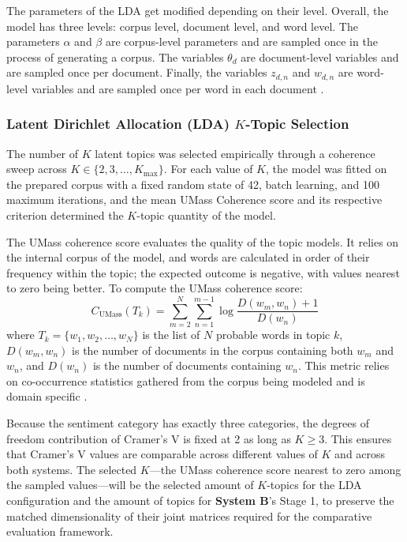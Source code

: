 \documentclass[12pt,a4paper]{report}
\newcommand{\sysB}{\textbf{System B}}
\begin{document}
The parameters of the LDA get modified depending on their level. Overall, the
model has three levels: corpus level, document level, and word level. The
parameters $\alpha$ and $\beta$ are corpus-level parameters and are sampled once
in the process of generating a corpus. The variables $\theta_d$ are
document-level variables and are sampled once per document. Finally, the
variables $z_{d,n}$ and $w_{d,n}$ are word-level variables and are sampled once
per word in each document \parencite{blei2003}.

\subsubsection{Latent Dirichlet Allocation (LDA) $K$-Topic Selection}

The number of $K$ latent topics was selected empirically through a coherence
sweep across $K \in \{2,3,\dots,K_{\max}\}$. For each value of $K$, the model
was fitted on the prepared corpus with a fixed random state of 42, batch
learning, and 100 maximum iterations, and the mean UMass Coherence score and
its respective criterion determined the $K$-topic quantity of the model.

The UMass coherence score evaluates the quality of the topic models. It relies
on the internal corpus of the model, and words are calculated in order of their
frequency within the topic; the expected outcome is negative, with values
nearest to zero being better. To compute the UMass coherence score:
\begin{equation}
  C_{\mathrm{UMass}}(T_k)
  = \sum_{m=2}^{N} \sum_{n=1}^{m-1}
    \log \frac{D(w_m, w_n) + 1}{D(w_n)}
  \label{eq:umass}
\end{equation}
where $T_k = \{w_1, w_2, \dots, w_N\}$ is the list of $N$ probable words in
topic $k$, $D(w_m, w_n)$ is the number of documents in the corpus containing
both $w_m$ and $w_n$, and $D(w_n)$ is the number of documents containing $w_n$.
This metric relies on co-occurrence statistics gathered from the corpus being
modeled and is domain specific \parencite{mimno2011}.

Because the sentiment category has exactly three categories, the degrees of
freedom contribution of Cramer's V is fixed at 2 as long as $K \geq 3$. This
ensures that Cramer's V values are comparable across different values of $K$
and across both systems. The selected $K$---the UMass coherence score nearest to
zero among the sampled values---will be the selected amount of $K$-topics for
the LDA configuration and the amount of topics for \sysB's Stage 1, to preserve
the matched dimensionality of their joint matrices required for the comparative
evaluation framework.
\end{document}
